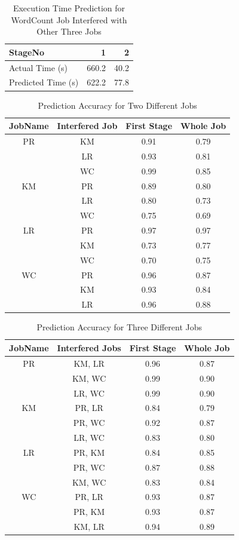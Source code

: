 \begin{table}[!htb]
\renewcommand{\arraystretch}{1.3}
\caption{Execution Time Prediction for WordCount Job Interfered with Other Three Jobs}
\label{wc20gprkmlr}
\centering
\begin{tabular}{l|r|r}
\hline
\bfseries StageNo & \bfseries 1 & \bfseries 2 \\
\hline \hline
Actual Time (s)
&660.2
&40.2 \\
\hline
Predicted Time (s) 
&622.2
&77.8 \\
\hline
\end{tabular}
\end{table}

\noindent
\begin{table}[!t]
\renewcommand{\arraystretch}{1.3}
\caption{Prediction Accuracy for Two Different Jobs}
\label{table_twojobs}
\centering
\begin{tabular}{c|c|c|c}
\hline
\bfseries JobName & \bfseries Interfered Job & \bfseries First Stage & \bfseries Whole Job\\
\hline\hline
PR & KM & 0.91 & 0.79\\
& LR & 0.93 & 0.81\\
& WC & 0.99 & 0.85\\
\hline
KM & PR & 0.89 & 0.80\\
& LR & 0.80 & 0.73\\
& WC & 0.75 & 0.69\\
\hline
LR & PR & 0.97 & 0.97 \\
& KM & 0.73 & 0.77\\
& WC & 0.70 & 0.75\\ 
\hline
WC & PR & 0.96 & 0.87\\
& KM & 0.93 & 0.84\\
& LR & 0.96 & 0.88\\
\hline
\end{tabular}
\end{table}


\begin{table}[!htb]
\renewcommand{\arraystretch}{1.3}
\caption{Prediction Accuracy for Three Different Jobs}
\label{table_threejobs}
\centering
\begin{tabular}{c|c|c|c}
\hline
\bfseries JobName & \bfseries Interfered Jobs & \bfseries First Stage & \bfseries Whole Job\\
\hline\hline
PR & KM, LR & 0.96 & 0.87\\
& KM, WC & 0.99 & 0.90\\
& LR, WC & 0.99 & 0.90\\
\hline
KM & PR, LR & 0.84 & 0.79\\
& PR, WC & 0.92 & 0.87\\
& LR, WC & 0.83 & 0.80\\
\hline
LR & PR, KM & 0.84 & 0.85\\
& PR, WC & 0.87 & 0.88\\
& KM, WC & 0.83 & 0.84\\
\hline
WC & PR, LR & 0.93 & 0.87\\
& PR, KM & 0.93 & 0.87\\
& KM, LR & 0.94 & 0.89\\
\hline
\end{tabular}
\end{table}


